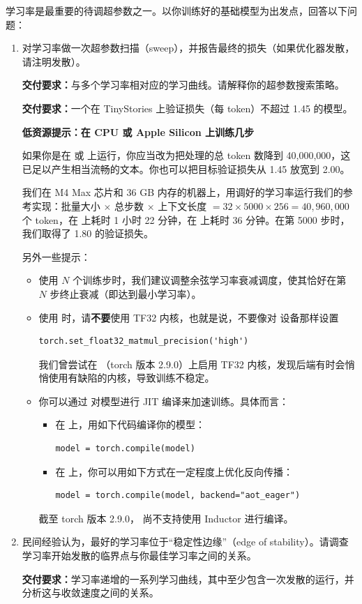 学习率是最重要的待调超参数之一。以你训练好的基础模型为出发点，回答以下问题：
\begin{enumerate}
  \item[(a)] 对学习率做一次超参数扫描（sweep），并报告最终的损失（如果优化器发散，请注明发散）。

  \textbf{交付要求：}与多个学习率相对应的学习曲线。请解释你的超参数搜索策略。

  \textbf{交付要求：}一个在 TinyStories 上验证损失（每 token）不超过 1.45 的模型。

  \textbf{低资源提示：在 CPU 或 Apple Silicon 上训练几步}

  如果你是在  或  上运行，你应当改为把处理的总 token 数降到 40,000,000，这已足以产生相当流畅的文本。你也可以把目标验证损失从 1.45 放宽到 2.00。

  我们在 M4 Max 芯片和 36 GB 内存的机器上，用调好的学习率运行我们的参考实现：批量大小 $\times$ 总步数 $\times$ 上下文长度 $= 32 \times 5000 \times 256 = 40{,}960{,}000$ 个 token，在  上耗时 1 小时 22 分钟，在  上耗时 36 分钟。在第 5000 步时，我们取得了 1.80 的验证损失。

  另外一些提示：
  \begin{itemize}
    \item 使用 $N$ 个训练步时，我们建议调整余弦学习率衰减调度，使其恰好在第 $N$ 步终止衰减（即达到最小学习率）。
    \item 使用  时，请\textbf{不要}使用 TF32 内核，也就是说，不要像对  设备那样设置
    \begin{lstlisting}
torch.set_float32_matmul_precision('high')
    \end{lstlisting}
    我们曾尝试在 （torch 版本 2.9.0）上启用 TF32 内核，发现后端有时会悄悄使用有缺陷的内核，导致训练不稳定。
    \item 你可以通过  对模型进行 JIT 编译来加速训练。具体而言：
    \begin{itemize}
      \item 在  上，用如下代码编译你的模型：
      \begin{lstlisting}
model = torch.compile(model)
      \end{lstlisting}
      \item 在  上，你可以用如下方式在一定程度上优化反向传播：
      \begin{lstlisting}
model = torch.compile(model, backend="aot_eager")
      \end{lstlisting}
    \end{itemize}
    截至 torch 版本 2.9.0， 尚不支持使用 Inductor 进行编译。
  \end{itemize}
  \item[(b)] 民间经验认为，最好的学习率位于``稳定性边缘''（edge of stability）。请调查学习率开始发散的临界点与你最佳学习率之间的关系。

  \textbf{交付要求：}学习率递增的一系列学习曲线，其中至少包含一次发散的运行，并分析这与收敛速度之间的关系。
\end{enumerate}

